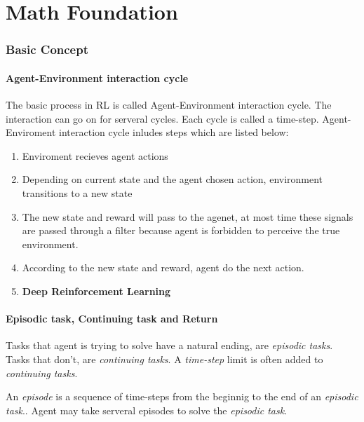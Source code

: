 \part{Math Foundation}

\section{Basic Concept}

\subsection{Agent-Environment interaction cycle}

The basic process in RL is called Agent-Environment interaction cycle. The interaction can go on for serveral cycles.
Each cycle is called a time-step. Agent-Enviroment interaction cycle inludes steps which are listed below:
\begin{enumerate}
\item
  Enviroment recieves agent actions
\item
  Depending on current state and the agent chosen action, environment transitions to a new state
\item
  The new state and reward will pass to the agenet, at most time these signals are passed through a filter because agent
  is forbidden to perceive the true environment.
\item
  According to the new state and reward, agent do the next action. 
\item
  {\bfseries \textcolor{myblue}{Deep Reinforcement Learning}}
\end{enumerate}

\subsection{Episodic task, Continuing task and Return}

\label{sec:episode}
Tasks that agent is trying to solve have a natural ending, are {\itshape episodic tasks}. Tasks that don't, are
{\itshape continuing tasks}. A {\itshape time-step} limit is often added to {\itshape continuing tasks}. \par

An \emph{episode} is a sequence of time-steps from the beginnig to the end of an \emph{episodic task}.. Agent may take serveral episodes to solve the {\itshape episodic task}.
 \par

